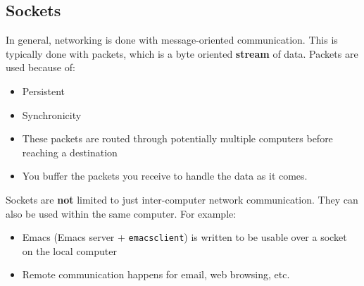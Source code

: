 \subsection{Sockets}\label{subsec:Sockets}
In general, networking is done with message-oriented communication.
This is typically done with packets, which is a byte oriented \textbf{stream} of data.
Packets are used because of:
\begin{itemize}[noitemsep]
\item Persistent
\item Synchronicity
\item These packets are routed through potentially multiple computers before reaching a destination
\item You buffer the packets you receive to handle the data as it comes.
\end{itemize}

Sockets are \textbf{not} limited to just inter-computer network communication.
They can also be used within the same computer.
For example:
\begin{itemize}[noitemsep]
\item Emacs (Emacs server + \texttt{emacsclient}) is written to be usable over a socket on the local computer
\item Remote communication happens for email, web browsing, etc.
\end{itemize}



